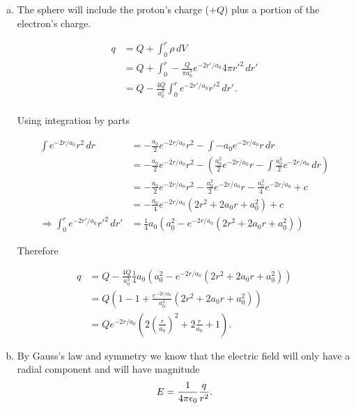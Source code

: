 \documentclass{article}
\begin{document}
\begin{enumerate}[a)]
  \item The sphere will include the proton's charge ($+Q$) plus a portion of the electron's charge.

        \begin{align*}
          q & = Q + \int_0^r \rho \, dV                                          \\
            & = Q + \int_0^r -\frac{Q}{\pi a_0^3} e^{-2r'/a_0} 4 \pi r'^2 \, dr' \\
            & = Q - \frac{4Q}{a_0^3} \int_0^r e^{-2r'/a_0} r'^2 \, dr'.          \\
        \end{align*}

        Using integration by parts

        \begin{align*}
          \int e^{-2 r / a_0} r^2 \, dr                    & = -\frac{a_0}{2} e^{-2 r / a_0} r^2 - \int -a_0 e^{-2 r / a_0} r \, dr                                                            \\
                                                           & = -\frac{a_0}{2} e^{-2 r / a_0} r^2 - \left( \frac{a_0^2}{2} e^{-2 r / a_0} r - \int \frac{a_0^2}{2} e^{-2 r / a_0} \, dr \right) \\
                                                           & = -\frac{a_0}{2} e^{-2 r / a_0} r^2 - \frac{a_0^2}{2} e^{-2 r / a_0} r - \frac{a_0^3}{4} e^{-2 r / a_0} + c                       \\
                                                           & = -\frac{a_0}{4} e^{-2 r / a_0} \left( 2 r^2 + 2 a_0 r + a_0^2 \right) + c                                                        \\
          \Rightarrow \int_0^r e^{-2 r' / a_0} r'^2 \, dr' & = \frac{1}{4} a_0 \left( a_0^2 - e^{-2 r / a_0} \left( 2 r^2 + 2 a_0 r + a_0^2 \right) \right)
        \end{align*}

        Therefore

        \begin{align*}
          q & = Q - \frac{4 Q}{a_0^3} \frac{1}{4} a_0 \left( a_0^2 - e^{-2 r / a_0} \left( 2 r^2 + 2 a_0 r + a_0^2 \right) \right) \\
            & = Q \left( 1 - 1 + \frac{e^{-2 r / a_0}}{a_0^2} \left( 2 r^2 + 2 a_0 r + a_0^2 \right) \right)                       \\
            & = Q e^{-2 r / a_0} \left( 2 \left( \frac{r}{a_0} \right)^2 + 2 \frac{r}{a_0} + 1 \right).
        \end{align*}

  \item By Gauss's law and symmetry we know that the electric field will only have a radial component and will have magnitude \[E = \frac{1}{4 \pi \epsilon_0} \frac{q}{r^2}.\]
\end{enumerate}
\end{document}
